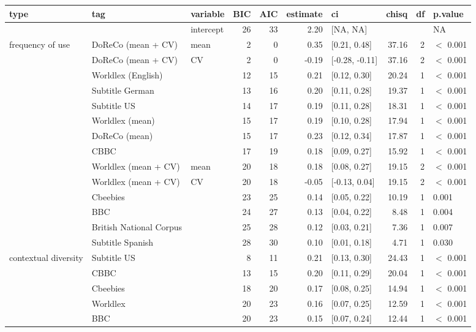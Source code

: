 \begin{table}[ht]
\centering
\begin{tabular}{lllrrrlrrl}
  \hline
type & tag & variable & BIC & AIC & estimate & ci & chisq & df & p.value \\ 
  \hline
 &  & intercept & 26 & 33 & 2.20 & [NA, NA] &  &  & NA \\ 
  frequency of use & DoReCo (mean + CV) & mean & 2 & 0 & 0.35 & [0.21, 0.48] & 37.16 & 2 & $<$ 0.001 \\ 
   & DoReCo (mean + CV) & CV & 2 & 0 & -0.19 & [-0.28, -0.11] & 37.16 & 2 & $<$ 0.001 \\ 
   & Worldlex (English) &  & 12 & 15 & 0.21 & [0.12, 0.30] & 20.24 & 1 & $<$ 0.001 \\ 
   & Subtitle German &  & 13 & 16 & 0.20 & [0.11, 0.28] & 19.37 & 1 & $<$ 0.001 \\ 
   & Subtitle US &  & 14 & 17 & 0.19 & [0.11, 0.28] & 18.31 & 1 & $<$ 0.001 \\ 
   & Worldlex (mean) &  & 15 & 17 & 0.19 & [0.10, 0.28] & 17.94 & 1 & $<$ 0.001 \\ 
   & DoReCo (mean) &  & 15 & 17 & 0.23 & [0.12, 0.34] & 17.87 & 1 & $<$ 0.001 \\ 
   & CBBC &  & 17 & 19 & 0.18 & [0.09, 0.27] & 15.92 & 1 & $<$ 0.001 \\ 
   & Worldlex (mean + CV) & mean & 20 & 18 & 0.18 & [0.08, 0.27] & 19.15 & 2 & $<$ 0.001 \\ 
   & Worldlex (mean + CV) & CV & 20 & 18 & -0.05 & [-0.13, 0.04] & 19.15 & 2 & $<$ 0.001 \\ 
   & Cbeebies &  & 23 & 25 & 0.14 & [0.05, 0.22] & 10.19 & 1 & 0.001 \\ 
   & BBC &  & 24 & 27 & 0.13 & [0.04, 0.22] & 8.48 & 1 & 0.004 \\ 
   & British National Corpus &  & 25 & 28 & 0.12 & [0.03, 0.21] & 7.36 & 1 & 0.007 \\ 
   & Subtitle Spanish &  & 28 & 30 & 0.10 & [0.01, 0.18] & 4.71 & 1 & 0.030 \\ 
  contextual diversity & Subtitle US &  & 8 & 11 & 0.21 & [0.13, 0.30] & 24.43 & 1 & $<$ 0.001 \\ 
   & CBBC &  & 13 & 15 & 0.20 & [0.11, 0.29] & 20.04 & 1 & $<$ 0.001 \\ 
   & Cbeebies &  & 18 & 20 & 0.17 & [0.08, 0.25] & 14.94 & 1 & $<$ 0.001 \\ 
   & Worldlex &  & 20 & 23 & 0.16 & [0.07, 0.25] & 12.59 & 1 & $<$ 0.001 \\ 
   & BBC &  & 20 & 23 & 0.15 & [0.07, 0.24] & 12.44 & 1 & $<$ 0.001 \\ 

\end{tabular}
\end{table}
